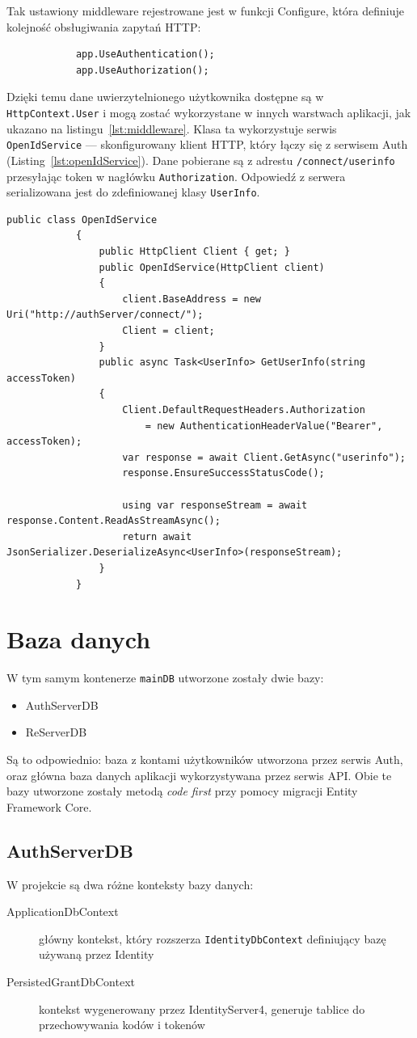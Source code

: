 		Tak ustawiony middleware rejestrowane jest w funkcji Configure, która definiuje kolejność obsługiwania zapytań HTTP:
		\begin{lstlisting}
			app.UseAuthentication();
			app.UseAuthorization();
		\end{lstlisting}
		Dzięki temu dane uwierzytelnionego użytkownika dostępne są w \verb|HttpContext.User| i mogą zostać wykorzystane w innych warstwach aplikacji, jak ukazano na listingu~\ref{lst:middleware}.
		Klasa ta wykorzystuje serwis \verb|OpenIdService| --- skonfigurowany klient HTTP, który łączy się z serwisem Auth (Listing~\ref{lst:openIdService}).
		Dane pobierane są z adrestu \verb|/connect/userinfo| przesyłając token w nagłówku \verb|Authorization|.
		Odpowiedź z serwera serializowana jest do zdefiniowanej klasy \verb|UserInfo|.
		\begin{lstlisting}[label=lst:openIdService, caption=Serwis HTTP pobierający dane użytkownika, float]
			public class OpenIdService
			{
				public HttpClient Client { get; }		
				public OpenIdService(HttpClient client)
				{
					client.BaseAddress = new Uri("http://authServer/connect/");
					Client = client;
				}
				public async Task<UserInfo> GetUserInfo(string accessToken)
				{
					Client.DefaultRequestHeaders.Authorization
						= new AuthenticationHeaderValue("Bearer", accessToken);
					var response = await Client.GetAsync("userinfo");
					response.EnsureSuccessStatusCode();
		
					using var responseStream = await response.Content.ReadAsStreamAsync();
					return await JsonSerializer.DeserializeAsync<UserInfo>(responseStream);
				}
			}
		\end{lstlisting}

\section{Baza danych}
	W tym samym kontenerze \verb|mainDB| utworzone zostały dwie bazy:
	\begin{itemize}
		\item AuthServerDB
		\item ReServerDB
	\end{itemize}
	Są to odpowiednio: baza z kontami użytkowników utworzona przez serwis Auth, oraz główna baza danych aplikacji wykorzystywana przez serwis API.
	Obie te bazy utworzone zostały metodą \emph{code first} przy pomocy migracji Entity Framework Core.

	\subsection{AuthServerDB}
		W projekcie są dwa różne konteksty bazy danych:
		\begin{description}
			\item[ApplicationDbContext] główny kontekst, który rozszerza \verb|IdentityDbContext| definiujący bazę używaną przez Identity
			\item[PersistedGrantDbContext] kontekst wygenerowany przez IdentityServer4, generuje tablice do przechowywania kodów i tokenów
		\end{description}

